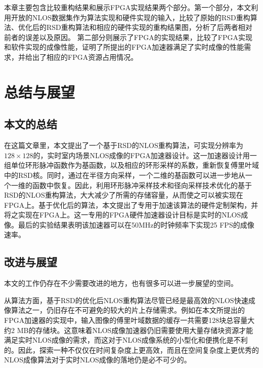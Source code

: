 \documentclass[master]{shtthesis}             %
\begin{document}
本章主要包含比较重构结果和展示FPGA实现结果两个部分。第一个部分，本文利用开放的NLOS数据集作为算法实现和硬件实现的输入，比较了原始的RSD重构算法、优化后的RSD重构算法和相应的硬件实现的重构结果图，分析了后两者相对前者的误差以及原因。
第二部分则展示了FPGA的实现结果，比较了FPGA实现和软件实现的成像性能，证明了所提出的FPGA加速器满足了实时成像的性能需求，并给出了相应的FPGA资源占用情况。

\chapter{总结与展望}

\section{本文的总结}

在这篇文章里，本文提出了一个基于RSD的NLOS重构算法，可实现分辨率为$128\times 128$的，实时室内场景NLOS成像的FPGA加速器设计。这一加速器设计用一组单位环形脉冲函数作为基函数，以及相应的环形采样的系数，重新恢复傅里叶域中的RSD核。同时，通过在半径方向采样，一个二维的基函数可以进一步地从一个一维的函数中恢复。因此，利用环形脉冲采样技术和径向采样技术优化的基于RSD的NLOS重构算法，大大减少了所需的存储容量，从而使之可以被实现在FPGA上。基于优化后的算法，本文提出了专用于加速该算法的硬件定制架构，并将之实现在FPGA上。这一专用的FPGA硬件加速器设计目标是实时的NLOS成像。最后的实验结果表明该加速器可以在50MHz的时钟频率下实现25 FPS的成像速率。

\section{改进与展望}

本文的工作仍存在不少需要改进的地方，也有很多可以进一步展望的空间。

从算法方面，基于RSD的优化后NLOS重构算法尽管已经是最高效的NLOS快速成像算法之一，仍旧存在不可避免的较大的片上存储需求。例如在本文所提出的FPGA加速器的实现中，输入图像的傅里叶域数据的缓存一共需要128块总容量大约2 MB的存储块。这意味着NLOS成像加速器仍旧需要使用大量存储块资源才能满足实时NLOS成像的需求，而这对于NLOS成像系统的小型化和便携化是不利的。因此，探索一种不仅仅在时间复杂度上更高效，而且在空间复杂度上更优秀的NLOS成像算法对于实时NLOS成像的落地仍是必不可少的。
\end{document}
